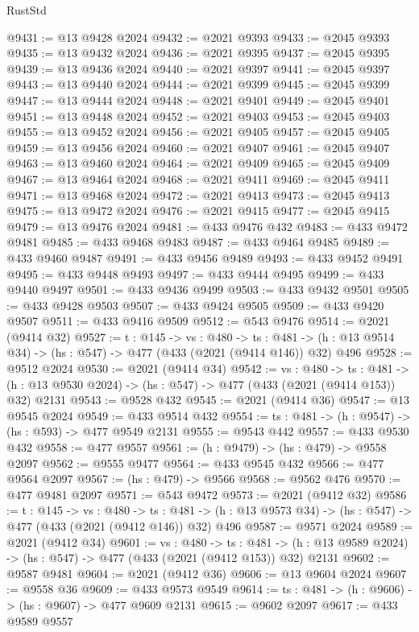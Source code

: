 \begin{lexlean}{RustStd}
\begin{coremodule}
@9431 := @13 @9428 @2024
@9432 := @2021 @9393
@9433 := @2045 @9393
@9435 := @13 @9432 @2024
@9436 := @2021 @9395
@9437 := @2045 @9395
@9439 := @13 @9436 @2024
@9440 := @2021 @9397
@9441 := @2045 @9397
@9443 := @13 @9440 @2024
@9444 := @2021 @9399
@9445 := @2045 @9399
@9447 := @13 @9444 @2024
@9448 := @2021 @9401
@9449 := @2045 @9401
@9451 := @13 @9448 @2024
@9452 := @2021 @9403
@9453 := @2045 @9403
@9455 := @13 @9452 @2024
@9456 := @2021 @9405
@9457 := @2045 @9405
@9459 := @13 @9456 @2024
@9460 := @2021 @9407
@9461 := @2045 @9407
@9463 := @13 @9460 @2024
@9464 := @2021 @9409
@9465 := @2045 @9409
@9467 := @13 @9464 @2024
@9468 := @2021 @9411
@9469 := @2045 @9411
@9471 := @13 @9468 @2024
@9472 := @2021 @9413
@9473 := @2045 @9413
@9475 := @13 @9472 @2024
@9476 := @2021 @9415
@9477 := @2045 @9415
@9479 := @13 @9476 @2024
@9481 := @433 @9476 @432
@9483 := @433 @9472 @9481
@9485 := @433 @9468 @9483
@9487 := @433 @9464 @9485
@9489 := @433 @9460 @9487
@9491 := @433 @9456 @9489
@9493 := @433 @9452 @9491
@9495 := @433 @9448 @9493
@9497 := @433 @9444 @9495
@9499 := @433 @9440 @9497
@9501 := @433 @9436 @9499
@9503 := @433 @9432 @9501
@9505 := @433 @9428 @9503
@9507 := @433 @9424 @9505
@9509 := @433 @9420 @9507
@9511 := @433 @9416 @9509
@9512 := @543 @9476
@9514 := @2021 (@9414 @32)
@9527 := {t : @145} ->
  {vs : @480} ->
  {ts : @481} -> (h : @13 @9514 @34) -> (hs : @547) -> @477 (@433 (@2021 (@9414 @146)) @32) @496
@9528 := @9512 @2024
@9530 := @2021 (@9414 @34)
@9542 := {vs : @480} ->
  {ts : @481} -> (h : @13 @9530 @2024) -> (hs : @547) -> @477 (@433 (@2021 (@9414 @153)) @32) @2131
@9543 := @9528 @432
@9545 := @2021 (@9414 @36)
@9547 := @13 @9545 @2024
@9549 := @433 @9514 @432
@9554 := {ts : @481} -> (h : @9547) -> (hs : @593) -> @477 @9549 @2131
@9555 := @9543 @442
@9557 := @433 @9530 @432
@9558 := @477 @9557
@9561 := (h : @9479) -> (hs : @479) -> @9558 @2097
@9562 := @9555 @9477
@9564 := @433 @9545 @432
@9566 := @477 @9564 @2097
@9567 := (hs : @479) -> @9566
@9568 := @9562 @476
@9570 := @477 @9481 @2097
@9571 := @543 @9472
@9573 := @2021 (@9412 @32)
@9586 := {t : @145} ->
  {vs : @480} ->
  {ts : @481} -> (h : @13 @9573 @34) -> (hs : @547) -> @477 (@433 (@2021 (@9412 @146)) @32) @496
@9587 := @9571 @2024
@9589 := @2021 (@9412 @34)
@9601 := {vs : @480} ->
  {ts : @481} -> (h : @13 @9589 @2024) -> (hs : @547) -> @477 (@433 (@2021 (@9412 @153)) @32) @2131
@9602 := @9587 @9481
@9604 := @2021 (@9412 @36)
@9606 := @13 @9604 @2024
@9607 := @9558 @36
@9609 := @433 @9573 @9549
@9614 := {ts : @481} -> (h : @9606) -> (hs : @9607) -> @477 @9609 @2131
@9615 := @9602 @2097
@9617 := @433 @9589 @9557

\end{coremodule}
\end{lexlean}
